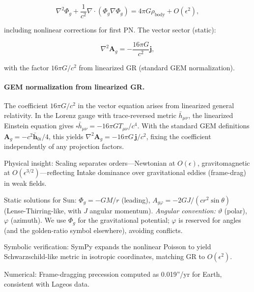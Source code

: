 \[
\nabla^2 \Phi_g + \frac{1}{c^2} \nabla \cdot (\Phi_g \nabla \Phi_g) = 4\pi G \rho_{\text{body}} + O(\epsilon^2),
\]

including nonlinear corrections for first PN. The vector sector (static):

\[
\nabla^2 \mathbf{A}_g = -\frac{16\pi G}{c^2} \mathbf{j},
\]

with the factor $16\pi G/c^2$ from linearized GR (standard GEM normalization).

\paragraph{GEM normalization from linearized GR.}
The coefficient $16\pi G/c^2$ in the vector equation arises from linearized general relativity.
In the Lorenz gauge with trace-reversed metric $\bar{h}_{\mu\nu}$, the linearized Einstein
equation gives $\square\bar{h}_{\mu\nu} = -16\pi G T_{\mu\nu}/c^4$. With the standard GEM
definitions $\mathbf{A}_g = -c^2\bar{\mathbf{h}}_{0i}/4$, this yields
$\nabla^2\mathbf{A}_g = -16\pi G\,\mathbf{j}/c^2$, fixing the coefficient independently
of any projection factors.

Physical insight: Scaling separates orders—Newtonian at $O(\epsilon)$, gravitomagnetic at $O(\epsilon^{3/2})$—reflecting Intake dominance over gravitational eddies (frame-drag) in weak fields.

Static solutions for Sun: $\Phi_g = -G M / r$ (leading), $A_{g\varphi} = -2 G J / (c r^2 \sin \theta)$ (Lense-Thirring-like, with $J$ angular momentum).
\noindent\emph{Angular convention:} $\vartheta$ (polar), $\varphi$ (azimuth). We use $\Phi_g$ for the gravitational potential; $\varphi$ is reserved for angles (and the golden-ratio symbol elsewhere), avoiding conflicts.

Symbolic verification: SymPy expands the nonlinear Poisson to yield Schwarzschild-like metric in isotropic coordinates, matching GR to $O(\epsilon^2)$.

Numerical: Frame-dragging precession computed as 0.019''/yr for Earth, consistent with Lageos data.

\medskip
\noindent
{}
\medskip

